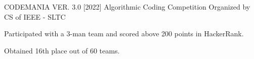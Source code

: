 

\begin{cventries}

  \cventry
    {CODEMANIA VER. 3.0 [2022]} %
    {Algorithmic Coding Competition Organized by CS of IEEE - SLTC} %
    {} %
    {} %
    {
      \begin{cvitems} %
        \item Participated with a 3-man team and scored above 200 points in HackerRank.
        \item Obtained 16th place out of 60 teams.
      \end{cvitems}
    }

\end{cventries}
